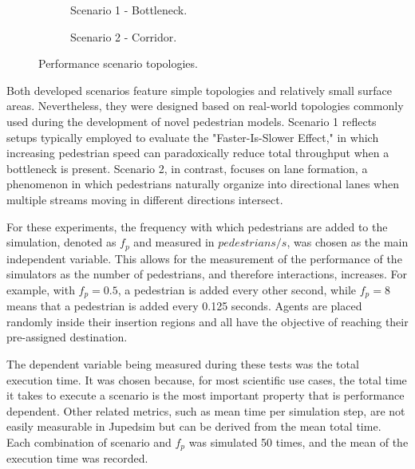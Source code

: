 \documentclass[twoside, 11pt]{article}
\begin{document}
\begin{figure}[h]
  \centering
  \begin{subfigure}{.33\textwidth}
    \centering
    
    \caption[Scenario 1 -  Bottleneck]{Scenario 1 -  Bottleneck.}
    \label{fig:sfig1}
  \end{subfigure}%
  \begin{subfigure}{.67\textwidth}
    \centering
    
    \caption[Scenario 2 - Corridor]{Scenario 2 - Corridor.}
    \label{fig:sfig1}
  \end{subfigure}%
  \caption[Performance scenario topologies]{Performance scenario topologies.}
  \label{fig:performace_scenario_topologies}
\end{figure}

Both developed scenarios feature simple topologies and relatively small surface areas. Nevertheless, they were designed based on real-world topologies commonly used during the development of novel pedestrian models. Scenario 1 reflects setups typically employed to evaluate the "Faster-Is-Slower Effect," in which increasing pedestrian speed can paradoxically reduce total throughput when a bottleneck is present. Scenario 2, in contrast, focuses on lane formation, a phenomenon in which pedestrians naturally organize into directional lanes when multiple streams moving in different directions intersect.

For these experiments, the frequency with which pedestrians are added to the simulation, denoted as $f_p$ and measured in $pedestrians/s$, was chosen as the main independent variable. This allows for the measurement of the performance of the simulators as the number of pedestrians, and therefore interactions, increases. For example, with $f_p = 0.5$, a pedestrian is added every other second, while $f_p = 8$ means that a pedestrian is added every 0.125 seconds. Agents are placed randomly inside their insertion regions and all have the objective of reaching their pre-assigned destination.

The dependent variable being measured during these tests was the total execution time. It was chosen because, for most scientific use cases, the total time it takes to execute a scenario is the most important property that is performance dependent. Other related metrics, such as mean time per simulation step, are not easily measurable in Jupedsim but can be derived from the mean total time. Each combination of scenario and $f_p$ was simulated 50 times, and the mean of the execution time was recorded.
\end{document}
